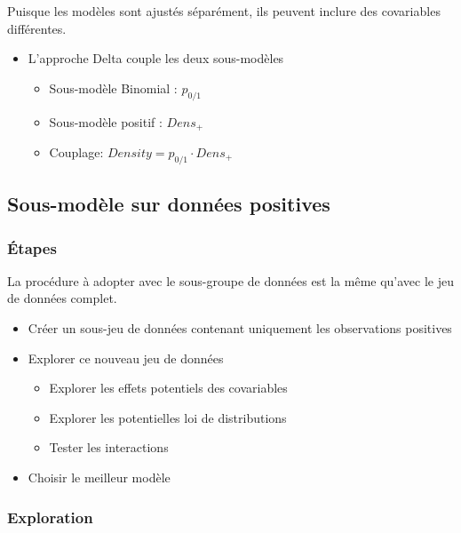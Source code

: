 \documentclass[french,a4paper]{article}
\providecommand{\tightlist}{%
  \setlength{\itemsep}{0pt}\setlength{\parskip}{0pt}}
\begin{document}
Puisque les modèles sont ajustés séparément, ils peuvent inclure des covariables différentes.

\begin{itemize}
\tightlist
\item
  L'approche Delta couple les deux sous-modèles

  \begin{itemize}
  \tightlist
  \item
    Sous-modèle Binomial : \(p_{0/1}\)
  \item
    Sous-modèle positif : \(Dens_{+}\)
  \item
    Couplage: \(Density = p_{0/1} \cdot Dens_{+}\)
  \end{itemize}
\end{itemize}

\hypertarget{sous-modele-sur-donnees-positives}{%
\subsection{Sous-modèle sur données positives}\label{sous-modele-sur-donnees-positives}}

\hypertarget{etapes-1}{%
\subsubsection{Étapes}\label{etapes-1}}

La procédure à adopter avec le sous-groupe de données est la même qu'avec le jeu de données complet.

\begin{itemize}
\tightlist
\item
  Créer un sous-jeu de données contenant uniquement les observations positives
\item
  Explorer ce nouveau jeu de données

  \begin{itemize}
  \tightlist
  \item
    Explorer les effets potentiels des covariables
  \item
    Explorer les potentielles loi de distributions
  \item
    Tester les interactions
  \end{itemize}
\item
  Choisir le meilleur modèle
\end{itemize}

\hypertarget{exploration}{%
\subsubsection{Exploration}\label{exploration}}
\end{document}
